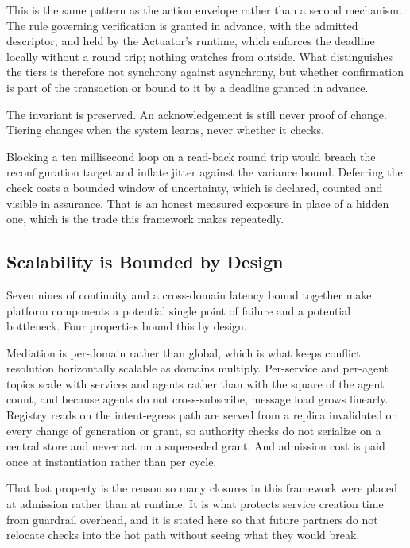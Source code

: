 This is the same pattern as the action envelope rather than a second
mechanism. The rule governing verification is granted in advance, with
the admitted descriptor, and held by the Actuator's runtime, which
enforces the deadline locally without a round trip; nothing watches from
outside. What distinguishes the tiers is therefore not synchrony against
asynchrony, but whether confirmation is part of the transaction or bound
to it by a deadline granted in advance.

The invariant is preserved. An acknowledgement is still never proof of
change. Tiering changes when the system learns, never whether it checks.

Blocking a ten millisecond loop on a read-back round trip would breach
the reconfiguration target and inflate jitter against the variance
bound. Deferring the check costs a bounded window of uncertainty, which
is declared, counted and visible in assurance. That is an honest
measured exposure in place of a hidden one, which is the trade this
framework makes repeatedly.

\hypertarget{scalability-is-bounded-by-design}{%
\subsection{Scalability is Bounded by Design}\label{scalability-is-bounded-by-design}}

Seven nines of continuity and a cross-domain latency bound together make
platform components a potential single point of failure and a potential
bottleneck. Four properties bound this by design.

Mediation is per-domain rather than global, which is what keeps conflict
resolution horizontally scalable as domains multiply. Per-service and
per-agent topics scale with services and agents rather than with the
square of the agent count, and because agents do not cross-subscribe,
message load grows linearly. Registry reads on the intent-egress path
are served from a replica invalidated on every change of generation or
grant, so authority checks do not serialize on a central store and never
act on a superseded grant. And admission cost is paid once at
instantiation rather than per cycle.

That last property is the reason so many closures in this framework were
placed at admission rather than at runtime. It is what protects service
creation time from guardrail overhead, and it is stated here so that
future partners do not relocate checks into the hot path without seeing
what they would break.

